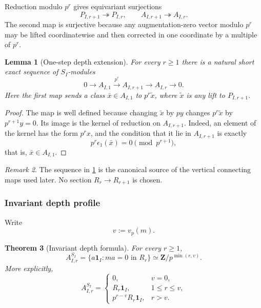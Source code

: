 \documentclass[11pt]{article}
\newtheorem{theorem}{Theorem}[section]
\newtheorem{lemma}[theorem]{Lemma}
\theoremstyle{remark}
\newtheorem{remark}[theorem]{Remark}
\newcommand{\Z}{\mathbf Z}
\begin{document}
Reduction modulo \(p^r\) gives equivariant surjections
\[
 P_{I,r+1}\twoheadrightarrow P_{I,r},
 \qquad
 A_{I,r+1}\twoheadrightarrow A_{I,r}.
\]
The second map is surjective because any augmentation-zero vector modulo \(p^r\) may be lifted coordinatewise and then corrected in one coordinate by a multiple of \(p^r\).

\begin{lemma}[One-step depth extension]\label{P1C-lem:one-step-extension}
For every \(r\ge1\) there is a natural short exact sequence of \(S_I\)-modules
\[
 \boxed{
 0\longrightarrow A_{I,1}
 \xrightarrow{\ p^r\ }
 A_{I,r+1}
 \longrightarrow A_{I,r}
 \longrightarrow0.}
\]
Here the first map sends a class \(\bar x\in A_{I,1}\) to \(p^r\tilde x\), where \(\tilde x\) is any lift to \(P_{I,r+1}\).
\end{lemma}

\begin{proof}
The map is well defined because changing \(\tilde x\) by \(p y\) changes \(p^r\tilde x\) by \(p^{r+1}y=0\).  Its image is the kernel of reduction on \(A_{I,r+1}\).  Indeed, an element of the kernel has the form \(p^r x\), and the condition that it lie in \(A_{I,r+1}\) is exactly
\[
 p^r\epsilon_1(\bar x)=0\pmod{p^{r+1}},
\]
that is, \(\bar x\in A_{I,1}\).
\end{proof}

\begin{remark}
The sequence in \cref{P1C-lem:one-step-extension} is the canonical source of the vertical connecting maps used later.  No section \(R_r\to R_{r+1}\) is chosen.
\end{remark}

\subsubsection{Invariant depth profile}

Write
\[
 v:=v_p(m).
\]

\begin{theorem}[Invariant depth formula]\label{P1C-thm:invariant-depth}
For every \(r\ge1\),
\[
 \boxed{
 A_{I,r}^{S_I}
 =\{a\mathbf1_I:ma=0\text{ in }R_r\}
 \simeq \Z/p^{\min(r,v)}.}
\]
More explicitly,
\[
 A_{I,r}^{S_I}=
 \begin{cases}
 0,&v=0,\\[1mm]
 R_r\mathbf1_I,&1\le r\le v,\\[1mm]
 p^{r-v}R_r\mathbf1_I,&r>v.
 \end{cases}
\]
\end{theorem}
\end{document}
